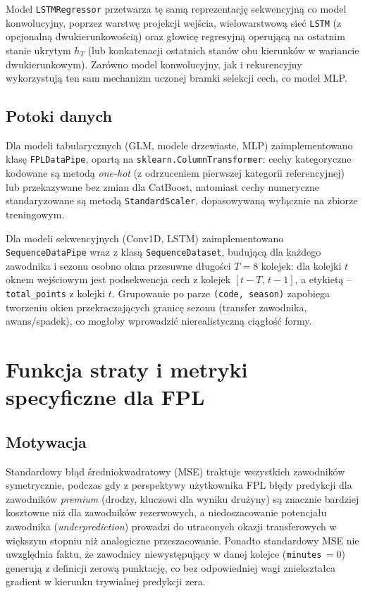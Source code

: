 \documentclass[a4paper,twoside,11pt]{mwrep}
\theoremstyle{plain} \newtheorem{thm}{Twierdzenie}
\theoremstyle{plain} \newtheorem{lem}{Lemat}
\theoremstyle{definition} \newtheorem{defn}{Definicja}
\theoremstyle{remark} \newtheorem*{rem}{Wniosek}
\begin{document}
Model \texttt{LSTMRegressor} przetwarza tę samą reprezentację sekwencyjną
co model konwolucyjny, poprzez warstwę projekcji wejścia, wielowarstwową
sieć \texttt{LSTM} (z opcjonalną dwukierunkowością) oraz głowicę
regresyjną operującą na ostatnim stanie ukrytym $h_T$ (lub konkatenacji
ostatnich stanów obu kierunków w wariancie dwukierunkowym). Zarówno model
konwolucyjny, jak i rekurencyjny wykorzystują ten sam mechanizm
uczonej bramki selekcji cech, co model MLP.

\section{Potoki danych}\label{sec:seqpipe}

Dla modeli tabularycznych (GLM, modele drzewiaste, MLP) zaimplementowano
klasę \texttt{FPLDataPipe}, opartą na \texttt{sklearn.ColumnTransformer}:
cechy kategoryczne kodowane są metodą \emph{one-hot} (z odrzuceniem
pierwszej kategorii referencyjnej) lub przekazywane bez zmian dla
CatBoost, natomiast cechy numeryczne standaryzowane są metodą
\texttt{StandardScaler}, dopasowywaną wyłącznie na zbiorze treningowym.

Dla modeli sekwencyjnych (Conv1D, LSTM) zaimplementowano
\texttt{SequenceDataPipe} wraz z klasą \texttt{SequenceDataset},
budującą dla każdego zawodnika i sezonu osobno okna przesuwne długości
$T=8$ kolejek: dla kolejki $t$ oknem wejściowym jest podsekwencja cech z
kolejek $[t-T,\,t-1]$, a etykietą -- \texttt{total\_points} z kolejki
$t$. Grupowanie po parze \texttt{(code, season)} zapobiega tworzeniu okien
przekraczających granicę sezonu (transfer zawodnika, awans/spadek), co
mogłoby wprowadzić nierealistyczną ciągłość formy.

\chapter{Funkcja straty i metryki specyficzne dla FPL}\label{ch:loss}

\section{Motywacja}

Standardowy błąd średniokwadratowy (MSE) traktuje wszystkich zawodników
symetrycznie, podczas gdy z perspektywy użytkownika FPL błędy predykcji
dla zawodników \emph{premium} (drodzy, kluczowi dla wyniku drużyny) są
znacznie bardziej kosztowne niż dla zawodników rezerwowych, a
niedoszacowanie potencjału zawodnika (\emph{underprediction}) prowadzi do
utraconych okazji transferowych w większym stopniu niż analogiczne
przeszacowanie. Ponadto standardowy MSE nie uwzględnia faktu, że
zawodnicy niewystępujący w danej kolejce (\texttt{minutes}$\,=0$) generują
z definicji zerową punktację, co bez odpowiedniej wagi zniekształca
gradient w kierunku trywialnej predykcji zera.
\end{document}
